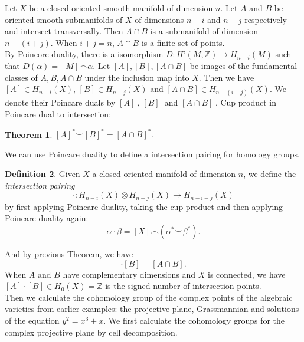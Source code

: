 \documentclass[psamsfonts]{amsart}
\newtheorem{theorem}{Theorem}[section]
\theoremstyle{definition}
\newtheorem{defn}[theorem]{Definition}
\theoremstyle{remark}
\numberwithin{equation}{section}
\begin{document}
		\indent Let $X$ be a closed oriented smooth manifold of dimension $n$. Let $A$ and $B$ be oriented smooth submanifolds of $X$ of dimensions $n-i$ and $n-j$ respectively and intersect transversally. Then $A \cap B$ is a submanifold of dimension $n-(i+j)$. When $i+j = n$, $A \cap B$ is a finite set of points.\\
		\indent By Poincore duality, there is a isomorphism $D: H^i(M,\mathbb{Z}) \to H_{n-i}(M)$ such that $D(\alpha) = [M] \frown \alpha$.
		Let $[A],[B],[A \cap B]$ be images of the fundamental classes of $A,B,A \cap B$ under the inclusion map into $X$. Then we have $[A] \in H_{n-i}(X)$, $[B] \in H_{n-j}(X)$ and $[A \cap B] \in H_{n-(i+j)}(X)$. We denote their Poincare duals by $[A]^\cdot $, $[B]^\cdot $ and $[A \cap B]^\cdot $. Cup product in Poincare dual to intersection:
		\begin{theorem}
			$[A]^* \smile [B]^* = [A \cap B]^*$.
		\end{theorem}
		
		We can use Poincare duality to define a intersection pairing for homology groups.
		\begin{defn}
			Given $X$ a closed oriented manifold of dimension $n$, we define the \textit{intersection pairing}
			\begin{equation}
				\cdot: H_{n-i}(X) \otimes H_{n-j}(X) \to H_{n-i-j}(X)
			\end{equation}
			by first applying Poincare duality, taking the cup product and then applying Poincare duality again:
			\begin{equation}
				\alpha \cdot \beta = [X] \frown (\alpha^* \smile \beta^*).
			\end{equation}
		\end{defn}
		And by previous Theorem, we have
		\begin{equation}
			[A] \cdot [B] = [A \cap B].
		\end{equation}
		When $A$ and $B$ have complementary dimensions and $X$ is connected, we have $[A] \cdot [B] \in H_0(X) = \mathbb{Z}$ is the signed number of intersection points.\\
		
		Then we calculate the cohomology group of the complex points of the algebraic varieties from earlier examples: the projective plane, Grassmannian and solutions of the equation $y^2 = x^3 + x$. We first calculate the cohomology groups for the complex projective plane by cell decomposition.
		
\end{document}
